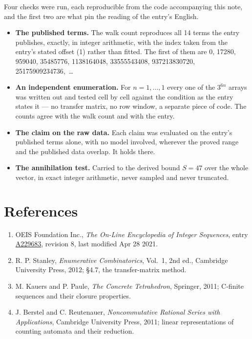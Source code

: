 \documentclass[11pt]{article}
\theoremstyle{definition}
\begin{document}
Four checks were run, each reproducible from the code accompanying this note, and the first two are what pin the reading of the entry's English.

\begin{itemize}

\item {\bfseries The published terms.} The walk count reproduces all 14 terms the entry publishes, exactly, in integer arithmetic, with the index taken from the entry's stated offset (1) rather than fitted. The first of them are 0, 17280, 959040, 35485776, 1138164048, 33555543408, 937213830720, 25175909234736,~\dots

\item {\bfseries An independent enumeration.} For $n = 1,\dots,1$ every one of the $3^{6n}$ arrays was written out and tested cell by cell against the condition as the entry states it --- no transfer matrix, no row window, a separate piece of code. The counts agree with the walk count and with the entry.

\item {\bfseries The claim on the raw data.} Each claim was evaluated on the entry's published terms alone, with no model involved, wherever the proved range and the published data overlap. It holds there.

\item {\bfseries The annihilation test.} Carried to the derived bound $S = 47$ over the whole vector, in exact integer arithmetic, never sampled and never truncated.

\end{itemize}

\section{References}

\begin{enumerate}

\item OEIS Foundation Inc., \emph{The On-Line Encyclopedia of Integer Sequences}, entry \href{https://oeis.org/A229683}{A229683}, revision 8, last modified Apr 28 2021.

\item R. P. Stanley, \emph{Enumerative Combinatorics}, Vol.~1, 2nd ed., Cambridge University Press, 2012; \S4.7, the transfer-matrix method.

\item M. Kauers and P. Paule, \emph{The Concrete Tetrahedron}, Springer, 2011; C-finite sequences and their closure properties.

\item J. Berstel and C. Reutenauer, \emph{Noncommutative Rational Series with Applications}, Cambridge University Press, 2011; linear representations of counting automata and their reduction.

\end{enumerate}
\end{document}
